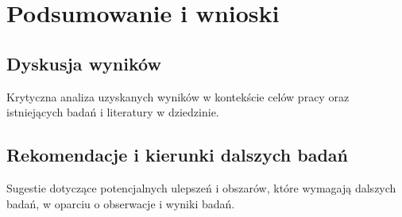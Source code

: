 \chapter{Podsumowanie i wnioski}
\section{Dyskusja wyników}
Krytyczna analiza uzyskanych wyników w kontekście celów pracy oraz istniejących badań i literatury w dziedzinie.
\section{Rekomendacje i kierunki dalszych badań}
Sugestie dotyczące potencjalnych ulepszeń i obszarów, które wymagają dalszych badań, w oparciu o obserwacje i wyniki badań.
